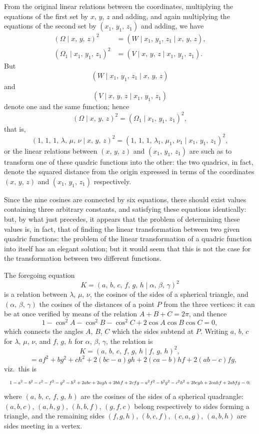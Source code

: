 \documentclass[11pt]{article}
\begin{document}
From the original linear relations between the coordinates, multiplying the
equations of the first set by $x$, $y$, $z$ and adding, and again multiplying the equations
of the second set by $(x_1,\, y_1,\, z_1)$ and adding, we have
\begin{align*}
   (\Omega \mid x,\, y,\, z)^2 &= (W \mid x_1,\, y_1,\, z_1 \mid x,\, y,\, z),\\
   (\Omega_1 \mid x_1,\, y_1,\, z_1)^2 &= (V \mid x,\, y,\, z \mid x_1,\, y_1,\, z_1).
\end{align*}
But
\[
   (W \mid x_1,\, y_1,\, z_1 \mid x,\, y,\, z)
\]
and
\[
   (V \mid x,\, y,\, z \mid x_1,\, y_1,\, z_1)
\]
denote one and the same function; hence
\[
   (\Omega \mid x,\, y,\, z)^2 = (\Omega_1 \mid x_1,\, y_1,\, z_1)^2,
\]
that is,
\[
   (1,\, 1,\, 1,\, \lambda,\, \mu,\, \nu \mid x,\, y,\, z)^2 = (1,\, 1,\, 1,\, \lambda_1,\, \mu_1,\, \nu_1 \mid x_1,\, y_1,\, z_1)^2,
\]
or the linear relations between $(x,\, y,\, z)$ and $(x_1,\, y_1,\, z_1)$ are such as to transform
one of these quadric functions into the other: the two quadrics, in fact, denote the
squared distance from the origin expressed in terms of the coordinates $(x,\, y,\, z)$ and
$(x_1,\, y_1,\, z_1)$ respectively.

Since the nine cosines are connected by six equations, there should exist values
containing three arbitrary constants, and satisfying these equations identically: but,
by what just precedes, it appears that the problem of determining these values is, in
fact, that of finding the linear transformation between two given quadric functions:
the problem of the linear transformation of a quadric function into itself has an
elegant solution; but it would seem that this is not the case for the transformation
between two different functions.

The foregoing equation
\[
   K = (a,\, b,\, c,\, f,\, g,\, h \mid \alpha,\, \beta,\, \gamma)^2
\]
is a relation between $\lambda$, $\mu$, $\nu$, the cosines of the sides of a spherical triangle, and
$(\alpha,\, \beta,\, \gamma)$ the cosines of the distances of a point $P$ from the three vertices: it can
be at once verified by means of the relation $A + B + C = 2\pi$, and thence
\[
   1 - \cos^2 A - \cos^2 B - \cos^2 C + 2\cos A \cos B \cos C = 0,
\]
which connects the angles $A$, $B$, $C$ which the sides subtend at $P$. Writing $a$, $b$, $c$
for $\lambda$, $\mu$, $\nu$, and $f$, $g$, $h$ for $\alpha$, $\beta$, $\gamma$, the relation is
\[
   K = (a,\, b,\, c,\, f,\, g,\, h \mid f,\, g,\, h)^2,
\]
\[
   \quad = af^2 + bg^2 + ch^2 + 2(bc - a)gh + 2(ca - b)hf + 2(ab - c)fg,
\]
viz.\ this is
\[
   \resizebox{\textwidth}{!}{$\displaystyle
   1 - a^2 - b^2 - c^2 - f^2 - g^2 - h^2 + 2abc + 2agh + 2bhf + 2cfg
       - a^2 f^2 - b^2 g^2 - c^2 h^2 + 2bcgh + 2cahf + 2abfg = 0;$}
\]
where $(a,\, b,\, c,\, f,\, g,\, h)$ are the cosines of the sides of a spherical quadrangle:
$(a, b, c)$, $(a, h, g)$, $(h, b, f)$, $(g, f, c)$ belong respectively to sides forming a triangle, and
the remaining sides $(f, g, h)$, $(b, c, f)$, $(c, a, g)$, $(a, b, h)$ are sides meeting in a vertex.
\end{document}
